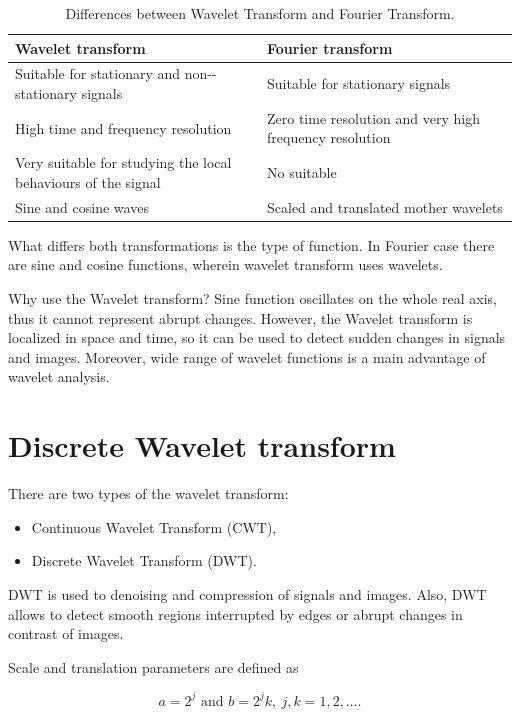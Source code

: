 \begin{table}[h]
\centering
\begin{tabular}{|p{0.5\linewidth}|p{0.5\linewidth}|}
\toprule
\textbf{ Wavelet transform} & \textbf{Fourier transform}
\\ \midrule
Suitable for stationary and non-\allowbreak -stationary signals 
& Suitable for stationary signals 
\\ \midrule
High time and frequency resolution
& Zero time resolution and very high frequency resolution     
\\ \midrule
Very suitable for studying the local behaviours of the signal
& No suitable  
\\ \midrule
Sine and cosine waves
& Scaled and translated mother wavelets
\\ \bottomrule
\end{tabular}
\caption{Differences between Wavelet Transform and Fourier Transform.}
\end{table}

What differs both transformations is the type of function. In Fourier case there are sine and cosine functions, wherein wavelet transform uses wavelets.

Why use the Wavelet transform?
Sine function oscillates on the whole real axis, thus it cannot represent abrupt changes. However, the Wavelet transform is localized in space and time, so it can be used to detect sudden changes in signals and images. Moreover, wide range of wavelet functions is a main advantage of wavelet analysis.

\section{Discrete Wavelet transform}
There are two types of the wavelet transform:
\begin{itemize}
\item Continuous Wavelet Transform (CWT),
\item Discrete Wavelet Transform (DWT).
\end{itemize}

DWT is used to denoising and compression of signals and images. Also, DWT allows to detect smooth regions interrupted by edges or abrupt changes in contrast of images.

Scale and translation parameters are defined as

\begin{equation}
a = 2^j \text{ and } b = 2^j k,\ j,k=1,2,\ldots.
\end{equation}

